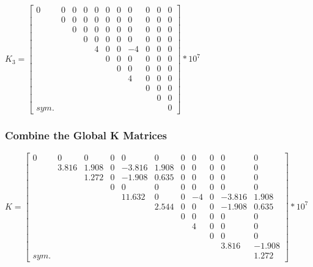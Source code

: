 \documentclass{article}
\begin{document}
$K_3=\begin{bmatrix}
    0 & 0 & 0 & 0 & 0 & 0 & 0 & 0 & 0 & 0 & 0 \\
    & 0 & 0 & 0 & 0 & 0 & 0 & 0 & 0 & 0 & 0 \\
    & & 0 & 0 & 0 & 0 & 0 & 0 & 0 & 0 & 0 \\
    & & & 0 & 0 & 0 & 0 & 0 & 0 & 0 & 0 \\
    & & & & 4 & 0 & 0 & -4 & 0 & 0 & 0 \\
    & & & & & 0 & 0 & 0 & 0 & 0 & 0 \\
    & & & & & & 0 & 0 & 0 & 0 & 0 \\
    & & & & & & & 4 & 0 & 0 & 0 \\
    & & & & & & & & 0 & 0 & 0 \\
    & & & & & & & & & 0 & 0 \\
    sym. & & & & & & & & & & 0
\end{bmatrix}*10^7$

\subsubsection*{Combine the Global K Matrices}
$K=\begin{bmatrix}
    0 & 0 & 0 & 0 & 0 & 0 & 0 & 0 & 0 & 0 & 0 \\
    & 3.816 & 1.908 & 0 & -3.816 & 1.908 & 0 & 0 & 0 & 0 & 0 \\
    & & 1.272 & 0 & -1.908 & 0.635 & 0 & 0 & 0 & 0 & 0 \\
    & & & 0 & 0 & 0 & 0 & 0 & 0 & 0 & 0 \\
    & & & & 11.632 & 0 & 0 & -4 & 0 & -3.816 & 1.908 \\
    & & & & & 2.544 & 0 & 0 & 0 & -1.908 & 0.635 \\
    & & & & & & 0 & 0 & 0 & 0 & 0 \\
    & & & & & & & 4 & 0 & 0 & 0 \\
    & & & & & & & & 0 & 0 & 0 \\
    & & & & & & & & & 3.816 & -1.908 \\
    sym. & & & & & & & & & & 1.272
\end{bmatrix}*10^7$
\end{document}
